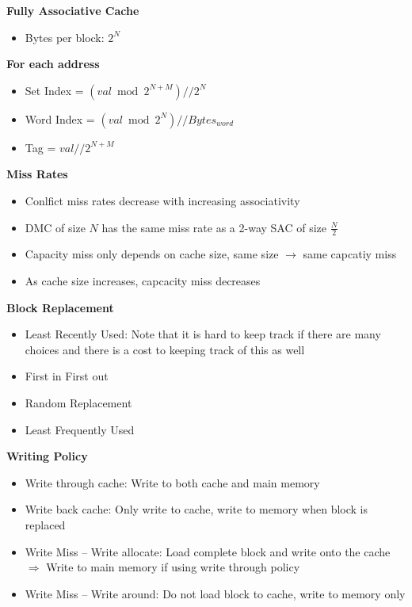 \documentclass[a4paper]{article} \usepackage[backend=biber, style=numeric, sorting=none]{biblatex}
\begin{document}
\begin{multicols*}{4}
\textbf{{Fully Associative Cache}}
\begin{itemize}[leftmargin=*]
\itemsep -0.5em
\item Bytes per block: $2^N$
\end{itemize}

\textbf{{For each address}}
\begin{itemize}[leftmargin=*]
\itemsep -0.5em
\item Set Index =  $(val \bmod 2^{N + M}) // 2^N$
\item Word Index =  $(val \bmod 2^{N}) // Bytes_{word}$
\item Tag =  $val // 2^{N + M}$
\end{itemize}

\textbf{{Miss Rates}}
\begin{itemize}[leftmargin=*]
\itemsep -0.5em
\item Conlfict miss rates decrease with increasing associativity
\item DMC of size $N$ has the same miss rate as a 2-way SAC of size $\frac{N}{2}$
\item Capacity miss only depends on cache size, same size $\rightarrow$ same capcatiy miss
\item As cache size increases, capcacity miss decreases
\end{itemize}

\textbf{{Block Replacement}}
\begin{itemize}[leftmargin=*]
\itemsep -0.5em
\item Least Recently Used: Note that it is hard to keep track if there are many choices and there is a cost to keeping track of this as well
\item First in First out
\item Random Replacement
\item Least Frequently Used
\end{itemize}

\textbf{{Writing Policy}}
\begin{itemize}[leftmargin=*]
\itemsep -0.5em
\item Write through cache: Write to both cache and main memory
\item Write back cache: Only write to cache, write to memory when block is replaced
\item Write Miss -- Write allocate: Load complete block and write onto the cache $\Rightarrow$ Write to main memory if using write through policy
\item Write Miss -- Write around: Do not load block to cache, write to memory only
\end{itemize}


\end{multicols*}
\end{document}
